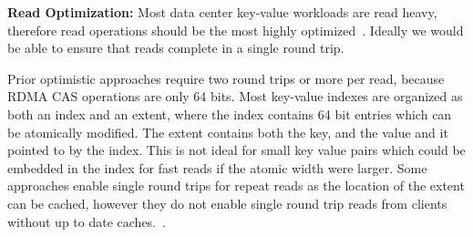 

\textbf{Read Optimization:} Most data center key-value
workloads are read heavy, therefore read operations should
be the most highly
optimized~\cite{datacenter-workloads,facebook-memcached}.
Ideally we would be able to ensure that reads complete in a
single round trip.

Prior optimistic approaches require two round trips or more
per read, because RDMA CAS operations are only 64 bits. Most
key-value indexes are organized as both an index and an
extent, where the index contains 64 bit entries which can be
atomically modified. The extent contains both the key, and
the value and it pointed to by the index. This is not ideal
for small key value pairs which could be embedded in the
index for fast reads if the atomic width were larger. Some
approaches enable single round trips for repeat reads as the
location of the extent can be cached, however they do not
enable single round trip reads from clients without up to
date caches.~\cite{clover}.



